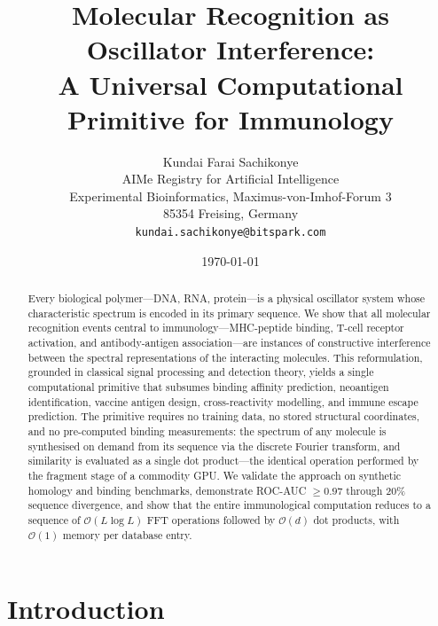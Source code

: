 \documentclass[twocolumn,11pt,a4paper]{article}
\theoremstyle{definition}
\theoremstyle{remark}
\begin{document}
\title{\textbf{Molecular Recognition as Oscillator Interference:\\
A Universal Computational Primitive for Immunology}}

\author{
Kundai Farai Sachikonye\\[0.3em]
AIMe Registry for Artificial Intelligence\\
Experimental Bioinformatics, Maximus-von-Imhof-Forum 3\\
85354 Freising, Germany\\
\texttt{kundai.sachikonye@bitspark.com}
}

\date{\today}
\maketitle

\begin{abstract}
Every biological polymer---DNA, RNA, protein---is a physical oscillator
system whose characteristic spectrum is encoded in its primary sequence.
We show that all molecular recognition events central to immunology---MHC-peptide
binding, T-cell receptor activation, and antibody-antigen association---are
instances of constructive interference between the spectral representations of
the interacting molecules. This reformulation, grounded in classical signal
processing and detection theory, yields a single computational primitive that
subsumes binding affinity prediction, neoantigen identification, vaccine antigen
design, cross-reactivity modelling, and immune escape prediction. The primitive
requires no training data, no stored structural coordinates, and no pre-computed
binding measurements: the spectrum of any molecule is synthesised on demand from
its sequence via the discrete Fourier transform, and similarity is evaluated as
a single dot product---the identical operation performed by the fragment stage
of a commodity GPU. We validate the approach on synthetic homology and binding
benchmarks, demonstrate ROC-AUC $\geq 0.97$ through 20\% sequence divergence,
and show that the entire immunological computation reduces to a sequence of
$\mathcal{O}(L\log L)$ FFT operations followed by $\mathcal{O}(d)$ dot
products, with $\mathcal{O}(1)$ memory per database entry.
\end{abstract}

\tableofcontents
\bigskip

\section{Introduction}
\label{sec:introduction}
\end{document}
